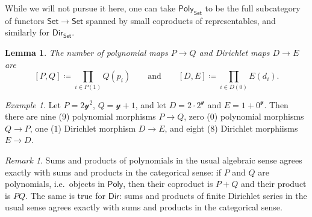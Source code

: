 \documentclass[11pt, article, one side]{memoir}
\theoremstyle{theorem}
\newtheorem{lemma}[equation]{Lemma}
\theoremstyle{definition}
\theoremstyle{remark}
\newtheorem{example}[equation]{Example}
\newtheorem{remark}[equation]{Remark}
\newcommand{\Cat}[1]{\mathsf{#1}}%
\newcommand{\smset}{\Cat{Set}}
\newcommand{\yon}{\mathcal{y}}
\newcommand{\poly}{\Cat{Poly}}
\newcommand{\dir}{\Cat{Dir}}
\newcommand{\qqand}{\qquad\text{and}\qquad}
\begin{document}
While we will not pursue it here, one can take $\poly_\smset$ to be the full subcategory of functors $\smset\to\smset$ spanned by small coproducts of representables, and similarly for $\dir_\smset$.

\begin{lemma}
The number of polynomial maps $P\to Q$ and Dirichlet maps $D\to E$ are
\[
  [P, Q]\coloneqq\prod_{i\in P(1)}Q(p_i)
  \qqand
  [D, E]\coloneqq\prod_{i\in D(0)}E(d_i).
\]
\end{lemma}

\begin{example}
Let $P=2\yon^2$, $Q=\yon+1$, and let $D=2\cdot2^\yon$ and $E=1+0^\yon$. Then there are nine ($9$) polynomial morphisms $P\to Q$, zero ($0$) polynomial morphisms $Q\to P$, one ($1$) Dirichlet morphism $D\to E$, and eight ($8$) Dirichlet morphiisms $E\to D$.
\end{example}

\begin{remark}\label{rem.products_coproducts}
Sums and products of polynomials in the usual algebraic sense agrees exactly with sums and products in the categorical sense: if $P$ and $Q$ are polynomials, i.e.\ objects in $\poly$, then their coproduct is $P+Q$ and their product is $PQ$. The same is true for $\dir$: sums and products of finite Dirichlet series in the usual sense agrees exactly with sums and products in the categorical sense.
\end{remark}
\end{document}
